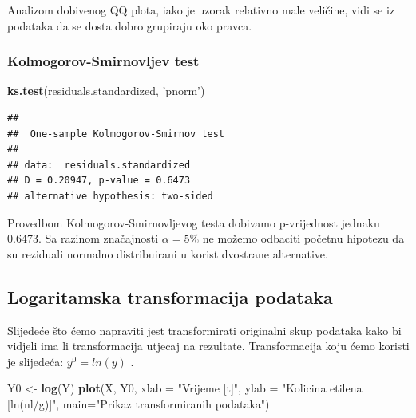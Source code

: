 \documentclass[]{article}
\newenvironment{Shaded}{\begin{snugshade}}{\end{snugshade}}
\newcommand{\KeywordTok}[1]{\textcolor[rgb]{0.13,0.29,0.53}{\textbf{{#1}}}}
\newcommand{\DataTypeTok}[1]{\textcolor[rgb]{0.13,0.29,0.53}{{#1}}}
\newcommand{\StringTok}[1]{\textcolor[rgb]{0.31,0.60,0.02}{{#1}}}
\newcommand{\NormalTok}[1]{{#1}}
\begin{document}
Analizom dobivenog QQ plota, iako je uzorak relativno male veličine,
vidi se iz podataka da se dosta dobro grupiraju oko pravca.

\subsubsection{Kolmogorov-Smirnovljev
test}\label{kolmogorov-smirnovljev-test}

\begin{Shaded}
\begin{Highlighting}[]
\KeywordTok{ks.test}\NormalTok{(residuals.standardized, }\StringTok{'pnorm'}\NormalTok{)}
\end{Highlighting}
\end{Shaded}

\begin{verbatim}
## 
##  One-sample Kolmogorov-Smirnov test
## 
## data:  residuals.standardized
## D = 0.20947, p-value = 0.6473
## alternative hypothesis: two-sided
\end{verbatim}

Provedbom Kolmogorov-Smirnovljevog testa dobivamo p-vrijednost jednaku
0.6473. Sa razinom značajnosti \(\alpha=5\%\) ne možemo odbaciti početnu
hipotezu da su reziduali normalno distribuirani u korist dvostrane
alternative.

\subsection{Logaritamska transformacija
podataka}\label{logaritamska-transformacija-podataka}

Slijedeće što ćemo napraviti jest transformirati originalni skup
podataka kako bi vidjeli ima li transformacija utjecaj na rezultate.
Transformacija koju ćemo koristi je slijedeća: \(y^0 = ln(y)\) .

\begin{Shaded}
\begin{Highlighting}[]
\NormalTok{Y0 <-}\StringTok{ }\KeywordTok{log}\NormalTok{(Y)}
\KeywordTok{plot}\NormalTok{(X, Y0, }\DataTypeTok{xlab =} \StringTok{"Vrijeme [t]"}\NormalTok{, }\DataTypeTok{ylab =} \StringTok{"Kolicina etilena [ln(nl/g)]"}\NormalTok{, }\DataTypeTok{main=}\StringTok{"Prikaz transformiranih podataka"}\NormalTok{)}
\end{Highlighting}
\end{Shaded}
\end{document}
